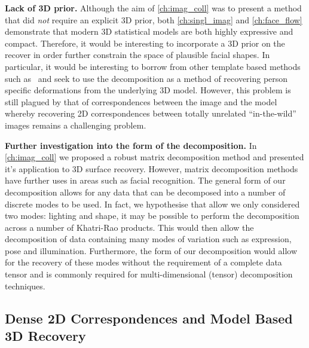 \textbf{Lack of 3D prior.} Although the aim of \cref{ch:imag_coll} was to 
present a method that did \textit{not} require an explicit 3D prior, both
\cref{ch:singl_imag} and \cref{ch:face_flow} demonstrate that modern 3D statistical
models are both highly expressive and compact. Therefore, it would be
interesting to incorporate a 3D prior on the recover in order further constrain
the space of plausible facial shapes. In particular, it would be interesting
to borrow from other template based methods 
such as~\cite{kemelmacher2011facereconstruction} and seek to use the decomposition
as a method of recovering person specific deformations from the underlying
3D model. However, this problem is still plagued by that of correspondences
between the image and the model whereby recovering 2D correspondences between
totally unrelated ``in-the-wild'' images remains a challenging problem.

\textbf{Further investigation into the form of the decomposition.}
In \cref{ch:imag_coll} we proposed a robust matrix decomposition method and 
presented it's application to 3D surface recovery. However, matrix decomposition
methods have further uses in areas such as facial recognition. The general
form of our decomposition allows for any data that can be decomposed into a number
of discrete modes to be used. In fact, we hypothesise that allow we only
considered two modes: lighting and shape, it may be possible to perform
the decomposition across a number of Khatri-Rao products. This would then allow
the decomposition of data containing many modes of variation such as expression,
pose and illumination. Furthermore, the form of our decomposition would
allow for the recovery of these modes without the requirement of a complete
data tensor and is commonly required for multi-dimensional (tensor) decomposition
techniques.
\subsection{Dense 2D Correspondences and Model Based 3D Recovery}

